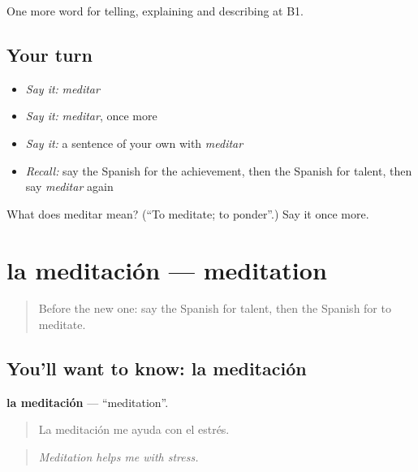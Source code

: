 \begin{grammarlens}[title={What you've built}]
One more word for telling, explaining and describing at B1.
\end{grammarlens}

\subsection*{Your turn}
\begin{itemize}
\raggedright
  \item \emph{Say it:} \emph{meditar}
  \item \emph{Say it:} \emph{meditar}, once more
  \item \emph{Say it:} a sentence of your own with \emph{meditar}
  \item \emph{Recall:} say the Spanish for the achievement, then the Spanish for talent, then say \emph{meditar} again
\end{itemize}

\begin{tcolorbox}[breakable,colback=teal!4,colframe=teal!35!black,title={Before you move on}]
What does meditar mean? (\textquotedblleft{}To meditate; to ponder\textquotedblright{}.) Say it once more.
\end{tcolorbox}
\section[la meditación]{la meditación — meditation}

\label{lesson:ES-C767-meditacion}



\begin{quote}
Before the new one: say the Spanish for talent, then the Spanish for to meditate.
\end{quote}

\subsection*{You'll want to know: la meditación}
\textbf{la meditación} — \textquotedblleft{}meditation\textquotedblright{}.

\begin{quote}
La meditación me ayuda con el estrés.
\end{quote}

\begin{quote}
\emph{Meditation helps me with stress.}
\end{quote}


